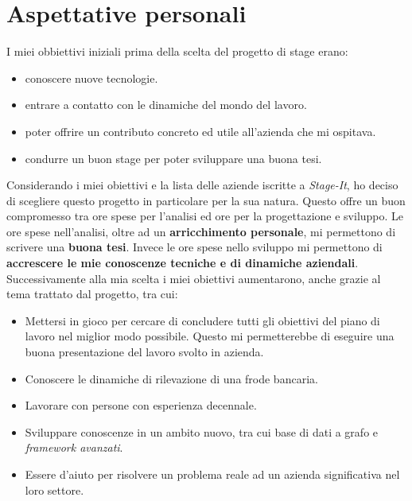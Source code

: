 \section{Aspettative personali}
I miei obbiettivi iniziali prima della scelta del progetto di stage erano:
\begin{itemize}
\item conoscere nuove tecnologie.
\item entrare a contatto con le dinamiche del mondo del lavoro.
\item poter offrire un contributo concreto ed utile all'azienda che mi ospitava.
\item condurre un buon stage per poter sviluppare una buona tesi.
\end{itemize}
Considerando i miei obiettivi e la lista delle aziende iscritte a \textit{Stage-It}, ho deciso di scegliere questo progetto in particolare per la sua natura. Questo offre un buon compromesso tra ore spese per l'analisi ed ore per la progettazione e sviluppo. Le ore spese nell'analisi, oltre ad un \textbf{arricchimento personale}, mi permettono di scrivere una \textbf{buona tesi}. Invece le ore spese nello sviluppo mi permettono di \textbf{accrescere le mie conoscenze tecniche e di dinamiche aziendali}. \\
Successivamente alla mia scelta i miei obiettivi aumentarono, anche grazie al tema trattato dal progetto, tra cui:
\begin{itemize}
\item Mettersi in gioco per cercare di concludere tutti gli obiettivi del piano di lavoro nel miglior modo possibile. Questo mi permetterebbe di eseguire una buona presentazione del lavoro svolto in azienda.
\item Conoscere le dinamiche di rilevazione di una frode bancaria.
\item Lavorare con persone con esperienza decennale.
\item Sviluppare conoscenze in un ambito nuovo, tra cui base di dati a grafo e \textit{framework avanzati}.
\item Essere d'aiuto per risolvere un problema reale ad un azienda significativa nel loro settore.
\end{itemize}






